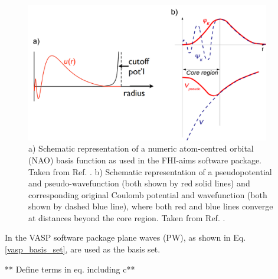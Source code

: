 \documentclass[11pt, twoside]{report}
\begin{document}
\begin{figure}[h!]
  \centering
    \includegraphics[width=0.95\textwidth]{figures/NACBF+PP.png}
    \caption[a) Schematic representation of a numeric atom-centred orbital (NAO) basis function as used in the FHI-aims software package. b) Schematic representation of a pseudopotential and pseudo-wavefunction (both shown by red solid lines) and corresponding original Coulomb potential and wavefunction (both shown by dashed blue line), where both red and blue lines converge at distances beyond the core region.]{a) Schematic representation of a numeric atom-centred orbital (NAO) basis function as used in the FHI-aims software package. Taken from Ref. . b) Schematic representation of a pseudopotential and pseudo-wavefunction (both shown by red solid lines) and corresponding original Coulomb potential and wavefunction (both shown by dashed blue line), where both red and blue lines converge at distances beyond the core region. Taken from Ref. .}
  \label{NACBF+PP}
\end{figure}

In the VASP software package \cite{VASP} plane waves (PW), as shown in Eq. \ref{vasp_basis_set}, are used as the basis set. 

** Define terms in eq. including c**\\
\end{document}
